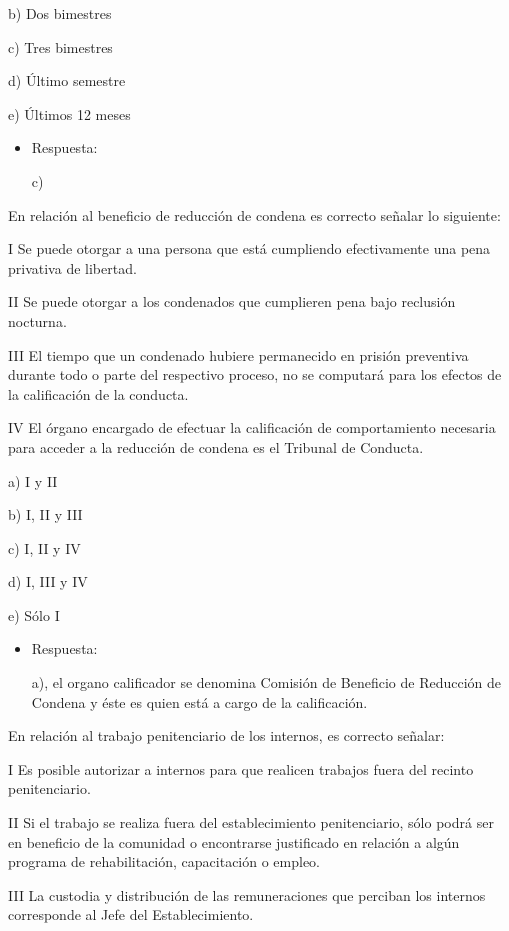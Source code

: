 \documentclass[letterpaper, 11pt]{article}
\begin{document}
b) Dos bimestres

c) Tres bimestres

d) Último semestre

e) Últimos 12 meses

\begin{itemize}
\item Respuesta:

c)
\end{itemize}


En relación al beneficio de reducción de condena es correcto señalar
lo siguiente:

I Se puede otorgar a una persona que está cumpliendo efectivamente una
pena privativa de libertad.

II Se puede otorgar a los condenados que cumplieren pena bajo
reclusión nocturna.

III El tiempo que un condenado hubiere permanecido en prisión
preventiva durante todo o parte del respectivo proceso, no se
computará para los efectos de la calificación de la conducta.

IV El órgano encargado de efectuar la calificación de comportamiento
necesaria para acceder a la reducción de condena es el Tribunal de
Conducta.


a) I y II

b) I, II y III

c) I, II y IV

d) I, III y IV

e) Sólo I

\begin{itemize}
\item Respuesta:

a), el organo calificador se denomina Comisión de Beneficio de
Reducción de Condena y éste es quien está a cargo de la
calificación.
\end{itemize}


En relación al trabajo penitenciario de los internos, es correcto
señalar:

I Es posible autorizar a internos para que realicen trabajos fuera del
recinto penitenciario.

II Si el trabajo se realiza fuera del establecimiento penitenciario,
sólo podrá ser en beneficio de la comunidad o encontrarse justificado
en relación a algún programa de rehabilitación, capacitación o empleo.

III La custodia y distribución de las remuneraciones que perciban los
internos corresponde al Jefe del Establecimiento.
\end{document}
